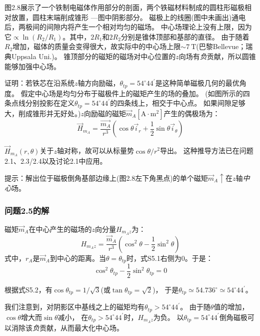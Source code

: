 图2.8展示了一个铁制电磁体作用部分的剖面，两个铁磁材料制成的圆柱形磁极相对放置，圆柱末端削成锥形
---图中阴影部分。
磁极上的线圈(图中未画出)通电后，两极间的间隙内将产生一个相对均匀的磁场。
中心场理论上没有上限，因为它$\propto \ln(R_2/R_1)$。其中，$2R_1$和$2R_2$分别是锥体顶部和基部的直径。
由于随着$R_2$增加，磁体的质量会变得很大，故实际中的中心场上限$\sim 7\ \mathrm{T}$(巴黎Bellevue；瑞典Uppsala Uni.)。
锥顶部分的磁矩的磁场对中心位置的$z$向场有\textit{负}贡献，所以圆锥能够加强中心场。

证明：若铁芯在沿系统$z$轴方向励磁，$\theta_{tp}=54^\circ 44^\prime$是这种简单磁极几何的最优角度。
假定中心场是均匀分布于磁极件上的磁矩产生的场的叠加。
(如图所示的四条点线分别投影在定义$\theta_{tp}=54^\circ 44^\prime$的四条线上，相交于中心点。
如果间隙足够大，削成锥形并无好处。)$z$向励磁的磁矩$\vec{m}_A [\mathrm{A\cdot m^2}]$产生的偶极场为：
\begin{equation}
\vec{H}_{m_A}=\frac{\vec{m_A}}{r^3}(\cos\theta \vec{i}_r+\frac{1}{2}\sin\theta\vec{i}_\theta)
\end{equation}

$\vec{H}_{m_A}(r,\theta)$关于$z$轴对称，故可以从标量势$\cos\theta/r^2$导出。
这种推导方法已在问题2.1、2.3/2.4以及讨论2.1中应用。

提示：解出位于磁极倒角基部边缘上(图2.8左下角黑点)的单个磁矩$\vec{m}_A \uparrow$在$z$轴\textit{中心}场。

\subsubsection*{问题2.5的解}
磁矩$\vec{m}_A$在中心产生的磁场的$z$向分量$H_{m_A z}$为：
\begin{equation*}
H_{m_A z}=\frac{\vec{m}_A}{r^3}(\cos^2\theta-\frac{1}{2}\sin^2\theta) \tag{S5.1}
\end{equation*}
式中，$r_A$是$\vec{m}_A$到中心的距离。当$\theta=\theta_{tp}$时，式S5.1右侧为0。于是：
\begin{equation*}
\cos^2\theta_{tp}-\frac{1}{2}\sin^2\theta_{tp}=0 \tag{S5.2}
\end{equation*}

根据式S5.2，有$\cos\theta_{tp}=1/\sqrt{3}$(或$\tan\theta_{tp}=\sqrt{2}$)，
于是$\theta_{tp}\simeq 54.736^\circ\simeq54^\circ 44^\prime$。

我们注意到，对阴影区中基线之上的磁矩均有$\theta_{tp}>54^\circ 44^\prime$。
由于随$\theta$值的增加，$\cos\theta$增大而$\sin\theta$减小，
在$\theta_{tp}>54^\circ 44^\prime$时，$H_{m_A z}$为负。
以$\theta_{tp}=54^\circ 44^\prime$倒角磁极可以消除该\textit{负}贡献，从而最大化中心场。

